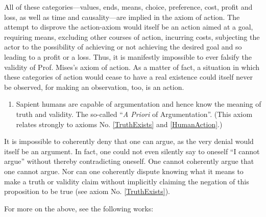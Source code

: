 \documentclass[letterpaper,12pt]{article}
\makeatletter
\newcommand{\asterism}{\smash{%
  \raisebox{-.5ex}{%
    \setlength{\tabcolsep}{-.5pt}%
    \begin{tabular}{@{}cc@{}}%
      \multicolumn2c*\\[-2ex]*&*%
    \end{tabular}}}}
\makeatother
\begin{document}
All of these categories---values, ends, means, choice, preference, cost, profit and loss, as well as time and causality---are implied in the axiom of action. The attempt to disprove the action-axiom would itself be an action aimed at a goal, requiring means, excluding other courses of action, incurring costs, subjecting the actor to the possibility of achieving or not achieving the desired goal and so leading to a profit or a loss. Thus, it is manifestly impossible to ever falsify the validity of Prof. Mises's axiom of action. As a matter of fact, a situation in which these categories of action would cease to have a real existence could itself never be observed, for making an observation, too, is an action.

\begin{enumerate}
\small
\setcounter{enumi}{3}
\item\label{Argument} Sapient humans are capable of argumentation and hence know the meaning of truth and validity. The so-called ``\emph{A Priori} of Argumentation''. (This axiom relates strongly to axioms No. \ref{TruthExists} and \ref{HumanAction}.)
\end{enumerate}

It is impossible to coherently deny that one can argue, as the very denial would itself be an argument. In fact, one could not even silently say to oneself ``I cannot argue'' without thereby contradicting oneself. One cannot coherently argue that one cannot argue. Nor can one coherently dispute knowing what it means to make a truth or validity claim without implicitly claiming the negation of this proposition to be true (see axiom No. \ref{TruthExists}).

\vspace{1em}
\centerline{\asterism}
\vspace{1em}

For more on the above, see the following works:
\end{document}
